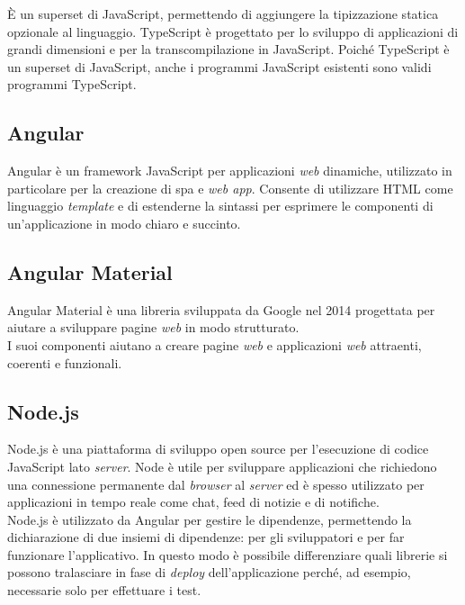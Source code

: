 È un \gls{superset} di JavaScript, permettendo di aggiungere la tipizzazione
statica opzionale al linguaggio. TypeScript è progettato per lo sviluppo di
applicazioni
di grandi dimensioni e per la \gls{transcompilazione} in JavaScript. Poiché
TypeScript è un \gls{superset} di JavaScript, anche i programmi JavaScript
esistenti sono validi programmi TypeScript. \cite{site-typescript}
\subsection*{Angular}
Angular è un \gls{framework} JavaScript per applicazioni \textit{web}
dinamiche, utilizzato in particolare per la creazione di \gls{spa} e
\textit{web app}. Consente di utilizzare HTML come linguaggio \textit{template}
e di estenderne la sintassi per esprimere le componenti di un'applicazione in
modo chiaro e succinto.

\subsection*{Angular Material}
Angular Material è una libreria sviluppata da Google nel 2014 progettata per
aiutare a sviluppare pagine \textit{web} in modo strutturato. \\
I suoi componenti aiutano a creare pagine \textit{web} e applicazioni
\textit{web} attraenti, coerenti e funzionali. \cite{site-Angular}

\subsection*{Node.js}
Node.js è una piattaforma di sviluppo open source per l'esecuzione di codice
JavaScript lato \textit{server}. Node è utile per sviluppare applicazioni che
richiedono una connessione permanente dal \textit{browser} al \textit{server}
ed è spesso utilizzato per applicazioni in tempo reale come chat, feed di
notizie e di notifiche.\\
Node.js è utilizzato da Angular per gestire le dipendenze, permettendo la
dichiarazione di due insiemi di dipendenze: per gli sviluppatori e per far
funzionare l'applicativo. In questo modo è possibile differenziare quali
librerie si possono tralasciare in fase di \textit{deploy} dell'applicazione
perché, ad esempio, necessarie solo per effettuare i test. \cite{site-node}
